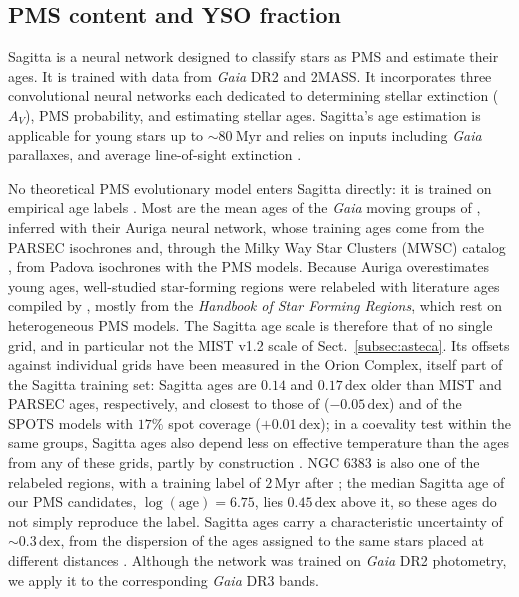 \documentclass{aa}
\begin{document}
\subsection{PMS content and YSO fraction}\label{subsec:sagitta}
Sagitta is a neural network designed to classify stars as PMS and estimate their ages. It is trained with data from \textit{Gaia} DR2 and 2MASS\@. It incorporates three convolutional neural networks each dedicated to determining stellar extinction ($A_V$), PMS probability, and estimating stellar ages. Sagitta's age estimation is applicable for young stars up to $\sim 80~\mathrm{Myr}$ and relies on inputs including \textit{Gaia} parallaxes, and average line-of-sight extinction \citep{2021AJ....162..282M}.

No theoretical PMS evolutionary model enters Sagitta directly: it is trained on empirical age labels \citep{2021AJ....162..282M}. Most are the mean ages of the \textit{Gaia} moving groups of \citet{2020AJ....160..279K}, inferred with their Auriga neural network, whose training ages come from the PARSEC isochrones \citep{2017ApJ...835...77M} and, through the Milky Way Star Clusters (MWSC) catalog \citep{2013A&A...558A..53K}, from Padova isochrones with the \citet{2000A&A...358..593S} PMS models. Because Auriga overestimates young ages, well-studied star-forming regions were relabeled with literature ages compiled by \citet{2021AJ....162..282M}, mostly from the \textit{Handbook of Star Forming Regions}, which rest on heterogeneous PMS models. The Sagitta age scale is therefore that of no single grid, and in particular not the MIST v1.2 scale of Sect.~\ref{subsec:asteca}. Its offsets against individual grids have been measured in the Orion Complex, itself part of the Sagitta training set: Sagitta ages are $0.14$ and $0.17\,\mathrm{dex}$ older than MIST and PARSEC ages, respectively, and closest to those of \citet{2015A&A...577A..42B} ($-0.05\,\mathrm{dex}$) and of the SPOTS models \citep{2020ApJ...891...29S} with $17\%$ spot coverage ($+0.01\,\mathrm{dex}$); in a coevality test within the same groups, Sagitta ages also depend less on effective temperature than the ages from any of these grids, partly by construction \citep{2023AJ....165..182K}. NGC 6383 is also one of the relabeled regions, with a training label of $2\,\mathrm{Myr}$ after \citet{2008hsf2.book..497R}; the median Sagitta age of our PMS candidates, $\log(\mathrm{age})=6.75$, lies $0.45\,\mathrm{dex}$ above it, so these ages do not simply reproduce the label. Sagitta ages carry a characteristic uncertainty of $\sim0.3\,\mathrm{dex}$, from the dispersion of the ages assigned to the same stars placed at different distances \citep{2021AJ....162..282M}. Although the network was trained on \textit{Gaia} DR2 photometry, we apply it to the corresponding \textit{Gaia} DR3 bands.
\end{document}
